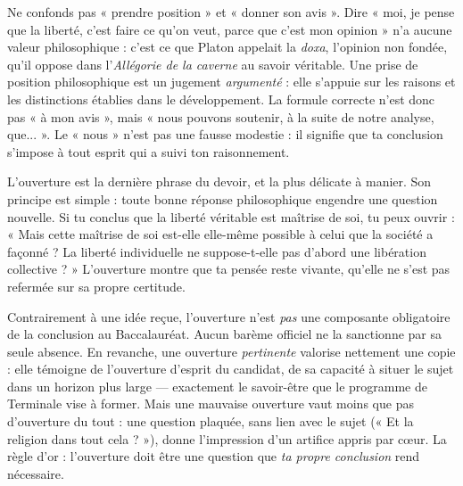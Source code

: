 \documentclass[11pt]{article}
\newcounter{popsec}
\newcounter{popsub}
\newcommand{\courssub}[1]{%
  \stepcounter{popsub}%
  \par\vspace{9pt}\noindent{\popxbold\fontsize{11.5}{13}\selectfont\color{popink}{\color{poporange}\thepopsec.\thepopsub}\hspace{6pt}#1}\par\nopagebreak\vspace{4pt}
}
\begin{document}
\begin{attention}
Ne confonds pas « prendre position » et « donner son avis ». Dire « moi, je pense que la liberté, c'est faire ce qu'on veut, parce que c'est mon opinion » n'a aucune valeur philosophique : c'est ce que Platon appelait la \emph{doxa}, l'opinion non fondée, qu'il oppose dans l'\emph{Allégorie de la caverne} au savoir véritable. Une prise de position philosophique est un jugement \emph{argumenté} : elle s'appuie sur les raisons et les distinctions établies dans le développement. La formule correcte n'est donc pas « à mon avis », mais « nous pouvons soutenir, à la suite de notre analyse, que... ». Le « nous » n'est pas une fausse modestie : il signifie que ta conclusion s'impose à tout esprit qui a suivi ton raisonnement.
\end{attention}

\courssub{L'ouverture : prolonger sans éparpiller}

L'ouverture est la dernière phrase du devoir, et la plus délicate à manier. Son principe est simple : toute bonne réponse philosophique engendre une question nouvelle. Si tu conclus que la liberté véritable est maîtrise de soi, tu peux ouvrir : « Mais cette maîtrise de soi est-elle elle-même possible à celui que la société a façonné ? La liberté individuelle ne suppose-t-elle pas d'abord une libération collective ? » L'ouverture montre que ta pensée reste vivante, qu'elle ne s'est pas refermée sur sa propre certitude.

\begin{savaistu}
Contrairement à une idée reçue, l'ouverture n'est \emph{pas} une composante obligatoire de la conclusion au Baccalauréat. Aucun barème officiel ne la sanctionne par sa seule absence. En revanche, une ouverture \emph{pertinente} valorise nettement une copie : elle témoigne de l'ouverture d'esprit du candidat, de sa capacité à situer le sujet dans un horizon plus large — exactement le savoir-être que le programme de Terminale vise à former. Mais une mauvaise ouverture vaut moins que pas d'ouverture du tout : une question plaquée, sans lien avec le sujet (« Et la religion dans tout cela ? »), donne l'impression d'un artifice appris par cœur. La règle d'or : l'ouverture doit être une question que \emph{ta propre conclusion} rend nécessaire.
\end{savaistu}
\end{document}

